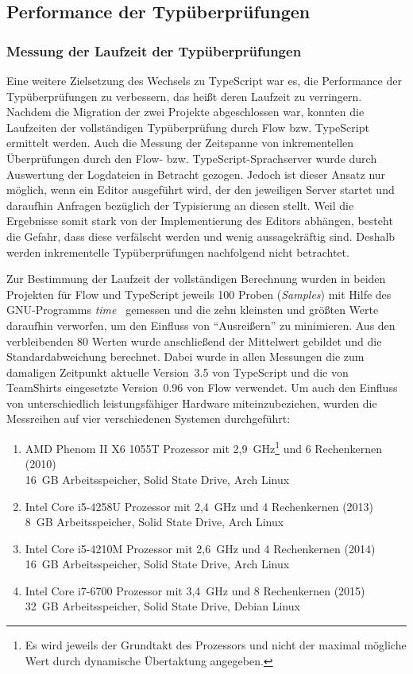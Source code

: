 \subsection{Performance der Typüberprüfungen}

\subsubsection{Messung der Laufzeit der Typüberprüfungen}

Eine weitere Zielsetzung des Wechsels zu TypeScript war es, die Performance der Typüberprüfungen zu verbessern, das heißt deren Laufzeit zu verringern. Nachdem die Migration der zwei Projekte abgeschlossen war, konnten die Laufzeiten der vollständigen Typüberprüfung durch Flow bzw. TypeScript ermittelt werden. Auch die Messung der Zeitspanne von inkrementellen Überprüfungen durch den Flow- bzw. TypeScript-Sprachserver wurde durch Auswertung der Logdateien in Betracht gezogen. Jedoch ist dieser Ansatz nur möglich, wenn ein Editor ausgeführt wird, der den jeweiligen Server startet und daraufhin Anfragen bezüglich der Typisierung an diesen stellt. Weil die Ergebnisse somit stark von der Implementierung des Editors abhängen, besteht die Gefahr, dass diese verfälscht werden und wenig aussagekräftig sind. Deshalb werden inkrementelle Typüberprüfungen nachfolgend nicht betrachtet.

Zur Bestimmung der Laufzeit der vollständigen Berechnung wurden in beiden Projekten für Flow und TypeScript jeweils 100 Proben (\textit{Samples}) mit Hilfe des GNU-Programms \textit{time}~\autocite{GNU_TIME} gemessen und die zehn kleinsten und größten Werte daraufhin verworfen, um den Einfluss von \enquote{Ausreißern} zu minimieren. Aus den verbleibenden 80 Werten wurde anschließend der Mittelwert gebildet und die Standardabweichung berechnet. Dabei wurde in allen Messungen die zum damaligen Zeitpunkt aktuelle Version~3.5 von TypeScript und die von TeamShirts eingesetzte Version~0.96 von Flow verwendet. Um auch den Einfluss von unterschiedlich leistungsfähiger Hardware miteinzubeziehen, wurden die Messreihen auf vier verschiedenen Systemen durchgeführt:

\begin{enumerate}[label=\Alph*.]
  \item AMD Phenom II X6 1055T Prozessor mit 2,9~GHz\footnote{Es wird jeweils der Grundtakt des Prozessors und nicht der maximal mögliche Wert durch dynamische Übertaktung angegeben.} und 6 Rechenkernen (2010)\\16~GB Arbeitsspeicher, Solid State Drive, Arch Linux
  \item Intel Core i5-4258U Prozessor mit 2,4~GHz und 4 Rechenkernen (2013)\\8~GB Arbeitsspeicher, Solid State Drive, Arch Linux
  \item Intel Core i5-4210M Prozessor mit 2,6~GHz und 4 Rechenkernen (2014)\\16~GB Arbeitsspeicher, Solid State Drive, Arch Linux
  \item Intel Core i7-6700 Prozessor mit 3,4~GHz und 8 Rechenkernen (2015)\\32~GB Arbeitsspeicher, Solid State Drive, Debian Linux
\end{enumerate}

